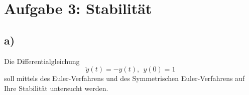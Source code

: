 \section{Aufgabe 3: Stabilität}
\label{sec:auf3}

\subsection{a)}
Die Differentialgleichung
\begin{equation}
    \ddot{y}(t) = -y(t),\ \ y(0)=1
\end{equation}
soll mittels des Euler-Verfahrens und des Symmetrischen Euler-Verfahrens auf Ihre Stabilität untersucht werden.\\
